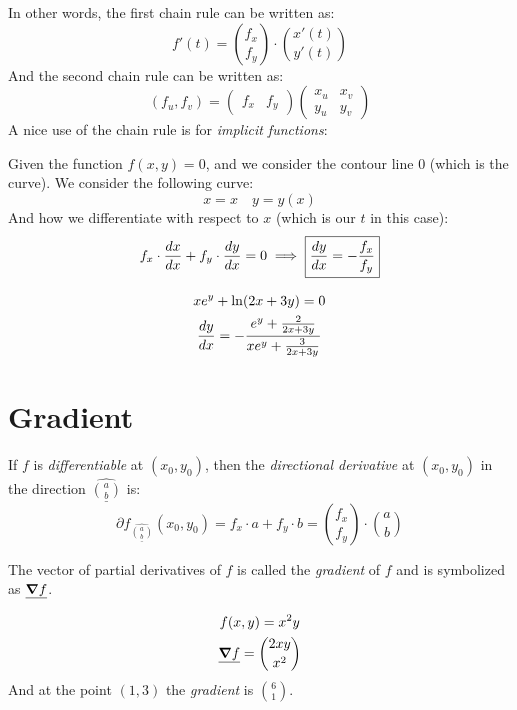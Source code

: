 \documentclass[00_complete]{subfiles}
\begin{document}
In other words, the first chain rule can be written as:
$$f'(t)=\binom{f_x}{f_y}\cdot\binom{x'(t)}{y'(t)}$$
And the second chain rule can be written as:
$$(f_u,f_v)=\begin{pmatrix}f_x&f_y\end{pmatrix}
\begin{pmatrix}x_u&x_v\\y_u&y_v\end{pmatrix}$$
A nice use of the chain rule is for \emph{implicit functions}:

Given the function $f(x,y)=0$, and we consider the contour line $0$ (which is the
curve). We consider the following curve:
$$x=x \quad y=y(x)$$
And how we differentiate with respect to $x$ (which is our $t$ in this case):
$$f_x\cdot \dv{x}{x} + f_y\cdot \dv{y}{x}=0 \implies
\boxed{\dv{y}{x}=-\frac{f_x}{f_y}}$$
\begin{example}
    \begin{gather*}
    xe^y+\ln(2x+3y)=0 \\
    \dv{y}{x} = -\frac{e^y+\frac{2}{2x+3y}}{xe^y+\frac{3}{2x+3y}}
    \end{gather*}
\end{example}
\section{Gradient}
\begin{reminder}
    If $f$ is \emph{differentiable} at $(x_0,y_0)$, then the \emph{directional
    derivative} at $(x_0,y_0)$ in the direction $\hat{\underline{\binom{a}{b}}}$
    is:
    $$\partial f_{\hat{\underline{\binom{a}{b}}}}(x_0,y_0)=f_x\cdot a +
    f_y\cdot b = \binom{f_x}{f_y}\cdot\binom{a}{b}$$
\end{reminder}
\begin{definition}[Gradient]
    The vector of partial derivatives of $f$ is called the \emph{gradient} of
    $f$ and is symbolized as $\underline {\grad f}$.
\end{definition}
\begin{example}
    \begin{gather*}
        f(x,y)=x^2y \\
        \underline{\grad f} = \binom{2xy}{x^2}
    \end{gather*}
    And at the point $(1,3)$ the \emph{gradient} is $\binom{6}{1}$.
\end{example}
\end{document}
